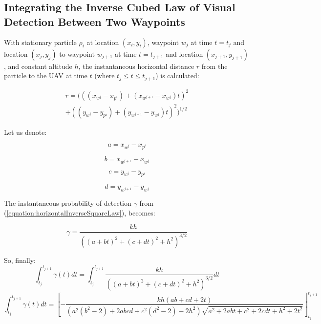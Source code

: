 \documentclass[10pt,a4paper, oneside, conference]{IEEEtran}
\begin{document}
	
	
	 	
	
	\clearpage
	\onecolumn
	\begin{appendices}
	\section{Integrating the Inverse Cubed Law of Visual Detection Between Two Waypoints}
	\label{appendix:integratingInverseCubedLaw}
	
With stationary particle $\rho_i$ at location $(x_{i},y_{i})$,  waypoint $w_j$ at time $t=t_j$ and location $(x_{j},y_{j})$ to waypoint $w_{j+1}$ at time $t=t_{j+1}$ and location $(x_{j+1},y_{j+1})$, and constant altitude $h$, the instantaneous horizontal distance $r$ from the particle to the UAV at time $t$ (where $t_j\leq t \leq t_{j+1}$) is calculated:

\begin{equation}
	\label{equation:particleWpDistanceAppendix}
\begin{split}
r = (((x_{w^j}-x_{p^i})+(x_{w^{j+1}}-x_{w^j}) t)^2\\
 + ((y_{w^j}-y_{p^i})+(y_{w^{j+1}}-y_{w^j}) t)^2)^{1/2}
\end{split}
\end{equation}	
	
Let us denote:

$$
a=x_{w^j}-x_{p^i}
$$	

$$
b=x_{w^{j+1}}-x_{w^j}
$$

$$
c=y_{w^j}-y_{p^i}
$$

$$
d=y_{w^{j+1}}-y_{w^j}
$$

The instantaneous probability of detection $\gamma$ from (\ref{equation:horizontalInverseSquareLaw}), becomes:

	\begin{equation}
	\label{equation:horizontalInverseSquareLawBetweenWPs}
	\gamma = \frac{kh}{((a+bt)^2+(c+dt)^2+h^2)^{3/2}}
	\end{equation}
	
	So, finally: 
	\begin{equation}
	\int_{t_j}^{t_{j+1}} \gamma(t)dt=\int_{t_j}^{t_{j+1}}\frac{kh}{((a+bt)^2+(c+dt)^2+h^2)^{3/2}}dt
	\end{equation}
	\begin{equation}
	\int_{t_j}^{t_{j+1}} \gamma(t)dt=\left[-\frac{kh(ab+cd+2t)}{(a^2(b^2-2)+2abcd+c^2(d^2-2)-2h^2)\sqrt{a^2+2abt+c^2+2cdt+h^2+2t^2}}\right]_{t_j}^{t_{j+1}}
	\end{equation}
	
	\end{appendices}
	
\end{document}
